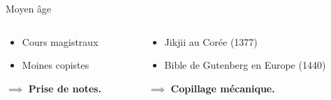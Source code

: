 \begin{frame}{Moyen âge}
\begin{columns}
	\begin{column}{0.49\linewidth}
		\begin{itemize}
			\item Cours magistraux
			\item Moines copistes
		\end{itemize}
		$\implies$ \textbf{Prise de notes.}
	\end{column}
	\begin{column}{0.49\linewidth}
		\begin{itemize}
			\item Jikjii au Corée (1377)
			\item Bible de Gutenberg en Europe (1440)
		\end{itemize}
		$\implies$ \textbf{Copillage mécanique.}
	\end{column}
\end{columns}
\end{frame}

